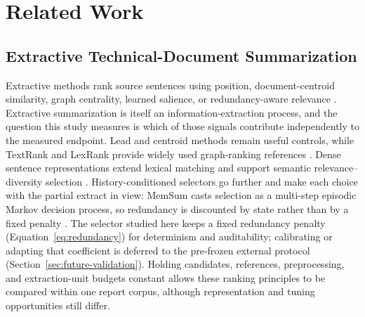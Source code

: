 \documentclass[information,article,submit,moreauthors]{Definitions/mdpi}
\begin{document}
\section{Related Work}

\subsection{Extractive Technical-Document Summarization}

Extractive methods rank source sentences using position, document-centroid similarity, graph centrality, learned salience, or redundancy-aware relevance \cite{zhong2020extractive,bi2021aredsum,liu2021unsupervised}. Extractive summarization is itself an information-extraction process, and the question this study measures is which of those signals contribute independently to the measured endpoint. Lead and centroid methods remain useful controls, while TextRank and LexRank provide widely used graph-ranking references \cite{mihalcea2004textrank,erkan2004lexrank}. Dense sentence representations extend lexical matching and support semantic relevance--diversity selection \cite{reimers2019sentencebert}. History-conditioned selectors go further and make each choice with the partial extract in view: MemSum casts selection as a multi-step episodic Markov decision process, so redundancy is discounted by state rather than by a fixed penalty \cite{gu2022memsum}. The selector studied here keeps a fixed redundancy penalty (Equation~\eqref{eq:redundancy}) for determinism and auditability; calibrating or adapting that coefficient is deferred to the pre-frozen external protocol (Section~\ref{sec:future-validation}). Holding candidates, references, preprocessing, and extraction-unit budgets constant allows these ranking principles to be compared within one report corpus, although representation and tuning opportunities still differ.
\end{document}
